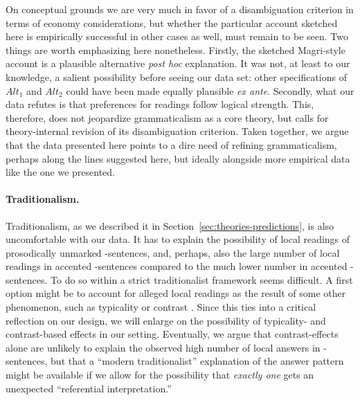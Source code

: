 \documentclass[fleqn,reqno,10pt]{article}
\newcommand{\as}{\acro{as}}
\renewcommand{\es}{\acro{es}}
\begin{document}
On conceptual grounds we are very much in favor of a disambiguation
criterion in terms of economy considerations, but whether the
particular account sketched here is empirically successful in other
cases as well, must remain to be seen. Two things are worth
emphasizing here nonetheless. Firstly, the sketched Magri-style
account is a plausible alternative \emph{post hoc} explanation. It was
not, at least to our knowledge, a salient possibility before seeing
our data set: other specifications of $Alt_1$ and $Alt_2$ could have
been made equally plausible \emph{ex ante}. Secondly, what our data
refutes is that preferences for readings follow logical
strength. This, therefore, does not jeopardize grammaticalism as a
core theory, but calls for theory-internal revision of its
disambiguation criterion. Taken together, we argue that the data
presented here points to a dire need of refining grammaticalism,
perhaps along the lines suggested here, but ideally alongside more
empirical data like the one we presented.

\paragraph{Traditionalism.} Traditionalism, as we described it in
Section~\ref{sec:theories-predictions}, is also uncomfortable with our
data. It has to explain the possibility of local readings of
prosodically unmarked \es-sentences, and, perhaps, also the large
number of local readings in accented \es-sentences compared to the
much lower number in accented \as-sentences. To do so within a strict
traditionalist framework seems difficult. A first option might be to
account for alleged local readings as the result of some other
phenomenon, such as typicality or contrast
\citep{Tielvan-Tiel2012:Embedded-Scalar,GeurtsTielvan-Tiel2013:Embedded-Scalar,Tielvan-Tiel2014:Quantity-Matter}.
Since this ties into a critical reflection on our design, we will
enlarge on the possibility of typicality- and contrast-based effects
in our setting. Eventually, we argue that contrast-effects alone are
unlikely to explain the observed high number of local answers in
\es-sentences, but that a ``modern traditionalist'' explanation of the
answer pattern might be available if we allow for the possibility that
\emph{exactly one} gets an unexpected ``referential interpretation.''
\end{document}
